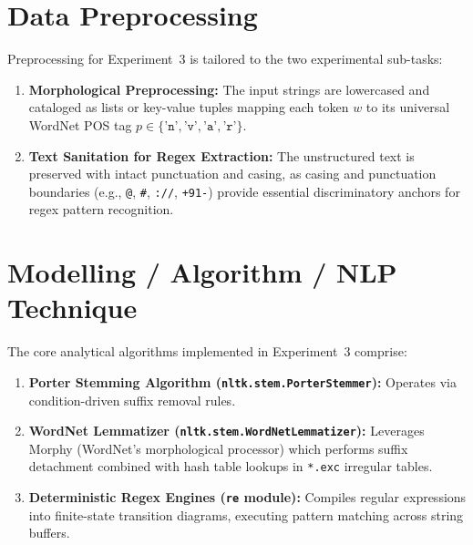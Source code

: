 \documentclass[12pt,a4paper]{report}
\begin{document}
\section{Data Preprocessing}
Preprocessing for Experiment~3 is tailored to the two experimental sub-tasks:
\begin{enumerate}
    \item \textbf{Morphological Preprocessing:} The input strings are lowercased and cataloged as lists or key-value tuples mapping each token $w$ to its universal WordNet POS tag $p \in \{\texttt{'n'}, \texttt{'v'}, \texttt{'a'}, \texttt{'r'}\}$.
    \item \textbf{Text Sanitation for Regex Extraction:} The unstructured text is preserved with intact punctuation and casing, as casing and punctuation boundaries (e.g., \texttt{@}, \texttt{\#}, \texttt{://}, \texttt{+91-}) provide essential discriminatory anchors for regex pattern recognition.
\end{enumerate}

\section{Modelling / Algorithm / NLP Technique}
The core analytical algorithms implemented in Experiment~3 comprise:
\begin{enumerate}
    \item \textbf{Porter Stemming Algorithm (\texttt{nltk.stem.PorterStemmer}):} Operates via condition-driven suffix removal rules.
    \item \textbf{WordNet Lemmatizer (\texttt{nltk.stem.WordNetLemmatizer}):} Leverages Morphy (WordNet's morphological processor) which performs suffix detachment combined with hash table lookups in \texttt{*.exc} irregular tables.
    \item \textbf{Deterministic Regex Engines (\texttt{re} module):} Compiles regular expressions into finite-state transition diagrams, executing pattern matching across string buffers.
\end{enumerate}
\end{document}
